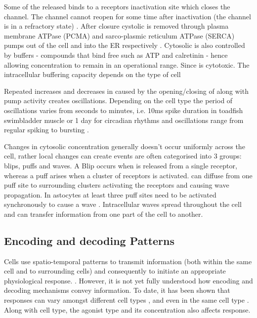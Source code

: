 \documentclass[../main.tex]{subfiles}
\begin{document}
Some of the released  binds to a receptors inactivation site which closes the channel. The channel cannot reopen for some time after inactivation (the channel is in a refractory state) \cite{Sneyd_2005, Lodish_1995}. After  closure cystolic  is removed through plasma membrane ATPase (PCMA) and sarco-plasmic reticulum ATPase (SERCA) pumps out of the cell and into the ER respectively \cite{Berridge_2007}. %
Cytosolic  is also controlled by buffers - compounds that bind free  such as ATP and calretinin - hence allowing  concentration to remain in an operational range. Since  is cytotoxic. The intracellular  buffering capacity depends on the type of cell \cite{Fewtrell_1993, Berridge_2003, Gilabert_2012}

Repeated increases and decreases in  caused by the opening/closing of  along with  pump activity creates  oscillations. Depending on the cell type the period of oscillations varies from seconds to minutes, i.e. 10ms spike duration in toadfish swimbladder muscle or 1 day  for circadian rhythms \cite{Evans_2001, Boulware_2008} and oscillations range from regular spiking to bursting \cite{Dupont_2003}.


Changes in cytosolic  concentration generally doesn't occur uniformly across the cell, rather local  changes can create 
 events are often categorised into 3 groups: blips, puffs and waves. A Blip occurs when  is released from a single receptor, whereas a puff arises when a cluster of receptors is activated.  can diffuse from one puff site to surrounding clusters activating the receptors and causing wave propagation. In astocytes at least three puff sites need to be activated synchronously to cause a wave \cite{Croft_2016}. Intracellular  waves spread throughout the cell and can transfer information from one part of the cell to another.  


\subsection{Encoding and decoding  Patterns}
Cells use spatio-temporal patterns to transmit information (both within the same cell and to surrounding cells) \cite{Petersen_1991,  Dolmetsch_1998, Politi_2006} and consequently to initiate an appropriate physiological response. \cite{Uhlen_2010, Berridge_1998}. However, it is not yet fully understood how encoding and decoding mechanisms convey information. To date, it has been shown that  responses can vary amongst different cell types \cite{Berridge_1988}, and even in the same cell type \cite{Rooney_1989}. Along with cell type, the agonist type \cite{Rooney_1989, Cornell-Bell_1990, Larsen_2004} and its concentration \cite{Berridge_1988} also affects  response. 
\end{document}
